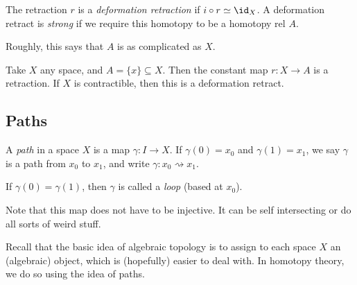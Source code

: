 \documentclass[a4paper]{article}
\begin{document}
\begin{defi}
  The retraction $r$ is a \emph{deformation retraction} if $i\circ r \simeq \id_X$. A deformation retract is \emph{strong} if we require this homotopy to be a homotopy rel $A$.
\end{defi}
Roughly, this says that $A$ is as complicated as $X$.

\begin{eg}
  Take $X$ any space, and $A = \{x\}\subseteq X$. Then the constant map $r: X\to A$ is a retraction. If $X$ is contractible, then this is a deformation retract.
\end{eg}

\subsection{Paths}
\begin{defi}[Path]
  A \emph{path} in a space $X$ is a map $\gamma: I\to X$. If $\gamma(0) = x_0$ and $\gamma(1) = x_1$, we say $\gamma$ is a path from $x_0$ to $x_1$, and write $\gamma: x_0 \rightsquigarrow x_1$.

  If $\gamma(0) = \gamma(1)$, then $\gamma$ is called a \emph{loop} (based at $x_0$).
  \begin{center}
  \end{center}
\end{defi}
Note that this map does not have to be injective. It can be self intersecting or do all sorts of weird stuff.

Recall that the basic idea of algebraic topology is to assign to each space $X$ an (algebraic) object, which is (hopefully) easier to deal with. In homotopy theory, we do so using the idea of paths.
\end{document}
